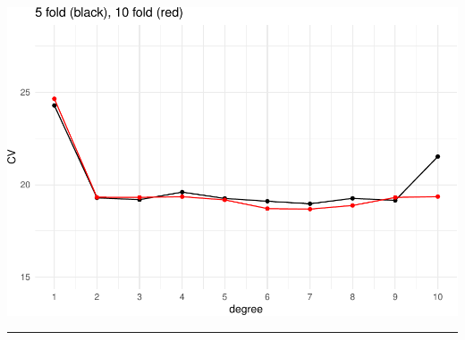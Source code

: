 \documentclass[]{article}
\begin{document}
\includegraphics{5Resample_files/figure-latex/unnamed-chunk-5-1.pdf}

\begin{center}\rule{0.5\linewidth}{\linethickness}\end{center}

\tiny
\end{document}
